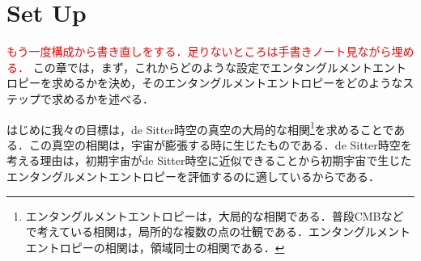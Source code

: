 \section{Set Up}
\textcolor{red}{もう一度構成から書き直しをする．足りないところは手書きノート見ながら埋める．}
この章では，まず，これからどのような設定でエンタングルメントエントロピーを求めるかを決め，そのエンタングルメントエントロピーをどのようなステップで求めるかを述べる．

はじめに我々の目標は，de Sitter時空の真空の大局的な相関\footnote{エンタングルメントエントロピーは，大局的な相関である．普段CMBなどで考えている相関は，局所的な複数の点の壮観である．エンタングルメントエントロピーの相関は，領域同士の相関である．}を求めることである．この真空の相関は，宇宙が膨張する時に生じたものである．de Sitter時空を考える理由は，初期宇宙がde Sitter時空に近似できることから初期宇宙で生じたエンタングルメントエントロピーを評価するのに適しているからである．
